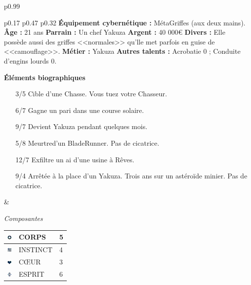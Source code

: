 \documentclass[11pt,twoside,a4paper]{article}
\def\imgCORPS{\includegraphics[width=0.25cm]{../../../../../imgGraphics/rolePlayingGame/SimulacreS/mini12x12/corps.png} }
\def\imgINSTI{\includegraphics[width=0.25cm]{../../../../../imgGraphics/rolePlayingGame/SimulacreS/mini12x12/instinct.png} }
\def\imgCOEUR{\includegraphics[width=0.25cm]{../../../../../imgGraphics/rolePlayingGame/SimulacreS/mini12x12/coeur.png} }
\def\imgESPRI{\includegraphics[width=0.25cm]{../../../../../imgGraphics/rolePlayingGame/SimulacreS/mini12x12/esprit.png} }
\begin{document}
\begin{longtable}[ht]{ p{} }
\begin{tabular}[h]{ p{} p{} p{} }
		\textbf{{\'E}quipement cybern{\'e}tique : }M{\'e}taGriffes (aux deux mains). \newline
		\textbf{{\^A}ge : } 21 ans 											\newline
		\textbf{Parrain : } Un chef Yakuza									\newline
		\textbf{Argent : } 40 000\euro 										\newline
		\textbf{Divers : } Elle poss{\`e}de aussi des griffes <<normales>> qu'lle met parfois en guise de <<camouflage>>. \newline
		\textbf{M{\'e}tier : } Yakuza 										\newline
		\textbf{Autres talents : } Acrobatie 0 ; Conduite d'engins lourds 0. \newline
		
		\textbf{{\'E}l{\'e}ments biographiques}
		\begin{itemize}
			\item[3/5] Cible d'une Chasse. Vous tuez votre Chasseur. 
			\item[6/7] Gagne un pari dans une course solaire. 
			\item[9/7] Devient Yakuza pendant quelques mois. 
			\item[5/8] Meurtred'un BladeRunner. Pas de cicatrice. 
			\item[12/7] Exfiltre un ai d'une usine {\`a} R{\^e}ves. 
			\item[9/4] Arr{\^e}t{\'e}e {\`a} la place d'un Yakuza. Trois ans sur un ast{\'e}ro{\"i}de minier. Pas de cicatrice. 
		\end{itemize}
		
		& %
		
			{\centering \emph{Composantes}}	\newline
				{\footnotesize %
				\begin{tabular}[h]{|p{0.25cm}|p{3.00cm}|p{0.75cm}|}
					\hline
					\imgCORPS & CORPS		&	5	\\
					\hline
					\imgINSTI & INSTINCT	&	4	\\
					\hline
					\imgCOEUR & C\OE UR		&	3	\\
					\hline
					\imgESPRI & ESPRIT		&	6	\\
					\hline
				\end{tabular} }
			\newline
			

\end{tabular}
\end{longtable}
\end{document}
